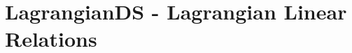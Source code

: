 \documentclass[10pt]{report}
\begin{document}
%
%
\section{LagrangianDS - Lagrangian Linear  Relations}
\end{document}
